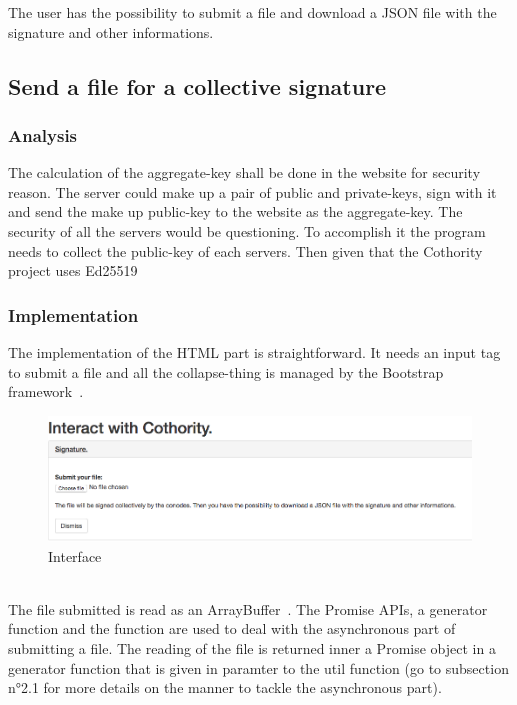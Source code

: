 \documentclass[11pt, a4paper, twoside, openright, openany]{book} %
\begin{document}
The user has the possibility to submit a file and download a JSON file with the
signature and other informations.\\

\subsection{Send a file for a collective signature}

\subsubsection{Analysis}
The calculation of the aggregate-key shall be done in the website for security reason.
The server could make up a pair of public and private-keys, sign with it and send
the make up public-key to the website as the aggregate-key. The security of all
the servers would be questioning.
To accomplish it the program needs to collect the public-key of each servers.
Then given that the Cothority project uses Ed25519 %

\subsubsection{Implementation}
The implementation of the HTML part is straightforward. It needs an input tag to
submit a file and all the collapse-thing is managed by the Bootstrap framework~\cite{bootstrap}.\\

\begin{figure}[ht!]
\centering
\includegraphics[width=125mm]{verification_signature.jpg}
\caption{Interface}
\end{figure}
\leavevmode \\

The file submitted is read as an ArrayBuffer~\cite{ArrayBuffer}. The Promise APIs,
a generator function and the  function are used to deal with
the asynchronous part of submitting a file. The reading of the file is returned
inner a Promise object in a generator function that is given in paramter to the
 util function (go to subsection n°2.1 for more details on
the manner to tackle the asynchronous part).\\ %
\end{document}
